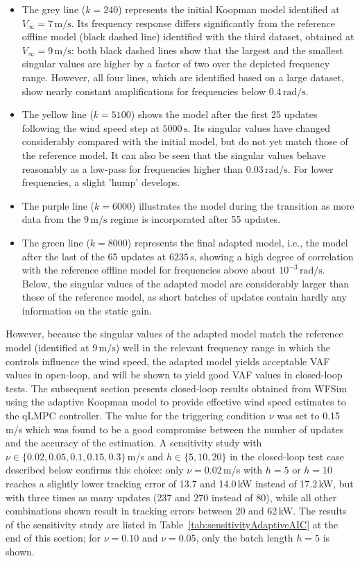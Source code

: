%
\begin{itemize}
    \item The grey line ($k = 240$) represents the initial Koopman model identified at $V_{\infty} = 7\,\mathrm{m/s}$. Its frequency response differs significantly from the reference offline model (black dashed line) identified with the third dataset, obtained at $V_{\infty} = 9\,\mathrm{m/s}$: both black dashed lines show that the largest and the smallest singular values are higher by a factor of two over the depicted frequency range. However, all four lines, which are identified based on a large dataset, show nearly constant amplifications for frequencies below $0.4\,\mathrm{rad/s}$.
    \item The yellow line ($k = 5100$) shows the model after the first 25 updates following the wind speed step at $5000\,\mathrm{s}$. Its singular values have changed considerably compared with the initial model, but do not yet match those of the reference model. It can also be seen that the singular values behave reasonably as a low-pass for frequencies higher than $0.03\,\mathrm{rad/s}$. For lower frequencies, a slight 'hump' develops.
    \item The purple line ($k = 6000$) illustrates the model during the transition as more data from the $9\,\mathrm{m/s}$ regime is incorporated after 55 updates.
    \item The green line ($k = 8000$) represents the final adapted model, i.e., the model after the last of the 65 updates at $6235\,\mathrm{s}$, showing a high degree of correlation with the reference offline model for frequencies above about $10^{-3}\,\mathrm{rad/s}$. Below, the singular values of the adapted model are considerably larger than those of the reference model, as short batches of updates contain hardly any information on the static gain.
\end{itemize}
%
However, because the singular values of the adapted model match the reference model (identified at $9\,\mathrm{m/s}$) well in the relevant frequency range in which the controls influence the wind speed, the adapted model yields acceptable VAF values in open-loop, and will be shown to yield good VAF values in closed-loop tests.
The subsequent section presents closed-loop results obtained from WFSim using the adaptive Koopman model to provide effective wind speed estimates to the qLMPC controller. The value for the triggering condition $\nu$ was set to 0.15\,m/s which was found to be a good compromise between the number of updates and the accuracy of the estimation. A sensitivity study with $\nu \in \{0.02, 0.05, 0.1, 0.15, 0.3\}$\,m/s and $h \in \{5, 10, 20\}$ in the closed-loop test case described below confirms this choice: only $\nu = 0.02$\,m/s with $h = 5$ or $h = 10$ reaches a slightly lower tracking error of 13.7 and 14.0\,kW instead of 17.2\,kW, but with three times as many updates (237 and 270 instead of 80), while all other combinations shown result in tracking errors between 20 and 62\,kW. The results of the sensitivity study are listed in Table~\ref{tab:sensitivityAdaptiveAIC} at the end of this section; for $\nu = 0.10$ and $\nu = 0.05$, only the batch length $h = 5$ is shown.




